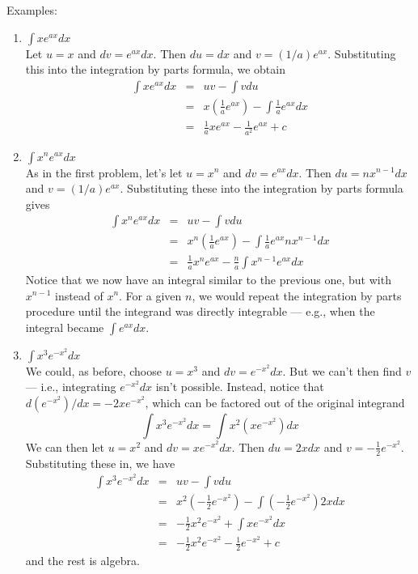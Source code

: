 \documentclass[20pt]{extarticle}
\newcommand{\be}{\begin{enumerate}}
\newcommand{\ee}{\end{enumerate}}
\newcommand{\beqa}{\begin{eqnarray}}
\newcommand{\eeqa}{\end{eqnarray}}
\newcommand{\non}{\nonumber}
\begin{document}
\item Examples:
  \be
  \item $\int x e^{ax} dx$\\[6pt]
  Let $u=x$ and $dv=e^{ax}dx$.  Then $du=dx$ and $v=(1/a)e^{ax}$.
Substituting this into the integration by parts formula, we obtain
\beqa
\int x e^{ax} dx &=& u v - \int v du\non\\
         &=&x\left( \frac{1}{a}e^{ax}\right) -
            \int\frac{1}{a}e^{ax}dx\non\\
         &=&\frac{1}{a}xe^{ax}-\frac{1}{a^2}e^{ax}+c\non
\eeqa
   \item $\int x^n e^{ax} dx$\\[6pt]
   As in the first problem, let's let $u=x^n$ and $dv=e^{ax}dx$.  Then
$du=n x^{n-1}dx$ and $v=(1/a)e^{ax}$.  Substituting these into the
integration by parts formula gives
\beqa
\int x^n e^{ax} dx &=& u v - \int v du\non\\
         &=&x^n\left( \frac{1}{a}e^{ax}\right) -
            \int\frac{1}{a}e^{ax} n x^{n-1} dx\non\\
         &=&\frac{1}{a}x^n e^{ax} -
             \frac{n}{a}\int x^{n-1}e^{ax}dx\non
\eeqa
Notice that we now have an integral similar to the previous one, but
with $x^{n-1}$ instead of $x^n$.  For a given $n$, we would repeat the
integration by parts procedure until the integrand was directly
integrable --- e.g., when the integral became $\int e^{ax}dx$.\\

  \item $\int x^3 e^{-x^2} dx$\\[6pt]
  We could, as before, choose $u=x^3$ and $dv=e^{-x^2}dx$.  But we
can't then find $v$ --- i.e., integrating $e^{-x^2}dx$ isn't possible.
Instead, notice that $d(e^{-x^2})/dx=-2xe^{-x^2}$, which can be factored
out of the original integrand $$\int x^3 e^{-x^2} dx = \int x^2
(xe^{-x^2})dx$$  We can then let $u=x^2$ and $dv=x e^{-x^2}dx$.  Then
$du=2x dx$ and $v=-\frac{1}{2}e^{-x^2}$.  Substituting these in, we have
\beqa
\int x^3 e^{-x^2} dx &=& u v - \int v du\non\\
             &=& x^2 \left( -\frac{1}{2}e^{-x^2}\right)
                 -\int \left(-\frac{1}{2}e^{-x^2}\right)2x dx\non\\
             &=& -\frac{1}{2}x^2 e^{-x^2}+\int x e^{-x^2}dx\non\\
             &=& -\frac{1}{2}x^2 e^{-x^2}-\frac{1}{2}e^{-x^2}+c\non
\eeqa
and the rest is algebra.

  \ee
\end{document}
